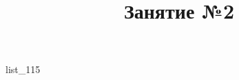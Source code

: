 \documentclass[12pt, a4paper]{article}
\begin{document}
	\title{Занятие №2}
	{list_115}
\end{document}
